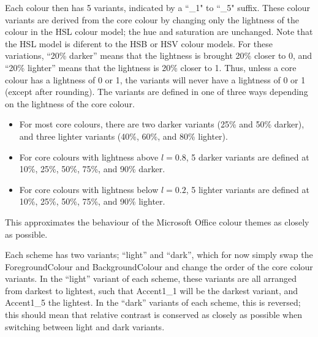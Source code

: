 \documentclass[]{article}
\begin{document}
  Each colour then has 5 variants, indicated by a ``\_1" to ``\_5" suffix. These colour variants are derived from the core colour by changing only the lightness of the colour in the HSL colour model; the hue and saturation are unchanged. Note that the HSL model is diferent to the HSB or HSV colour models. For these variations, ``20\% darker'' means that the lightness is brought 20\% closer to 0, and ``20\% lighter'' means that the lightness is 20\% closer to 1. Thus, unless a core colour has a lightness of 0 or 1, the variants will never have a lightness of 0 or 1 (except after rounding). The variants are defined in one of three ways depending on the lightness of the core colour.
  \begin{itemize}
      \item For most core colours, there are two darker variants (25\% and 50\% darker), and three lighter variants (40\%, 60\%, and 80\% lighter).
      \item For core colours with lightness above $l = 0.8$, 5 darker variants are defined at 10\%, 25\%, 50\%, 75\%, and 90\% darker.
      \item For core colours with lightness below $l = 0.2$, 5 lighter variants are defined at 10\%, 25\%, 50\%, 75\%, and 90\% lighter.
  \end{itemize}
  This approximates the behaviour of the Microsoft Office colour themes as closely as possible.

  Each scheme has two variants; ``light'' and ``dark'', which for now simply swap the ForegroundColour and BackgroundColour and change the order of the core colour variants. In the ``light'' variant of each scheme, these variants are all arranged from darkest to lightest, such that Accent1\_1 will be the darkest variant, and Accent1\_5 the lightest. In the ``dark'' variants of each scheme, this is reversed; this should mean that relative contrast is conserved as closely as possible when switching between light and dark variants.

\end{document}
